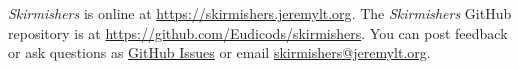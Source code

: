 \emph{Skirmishers} is online at \href{https://skirmishers.jeremylt.org}{https://skirmishers.jeremylt.org}.
The \emph{Skirmishers} GitHub repository is at \href{https://github.com/Eudicods/skirmishers}{https://github.com/Eudicods/skirmishers}.
You can post feedback or ask questions as \href{https://github.com/Eudicods/skirmishers/issues}{GitHub Issues} or email \href{mailto:skirmishers@jeremylt.org}{skirmishers@jeremylt.org}.
